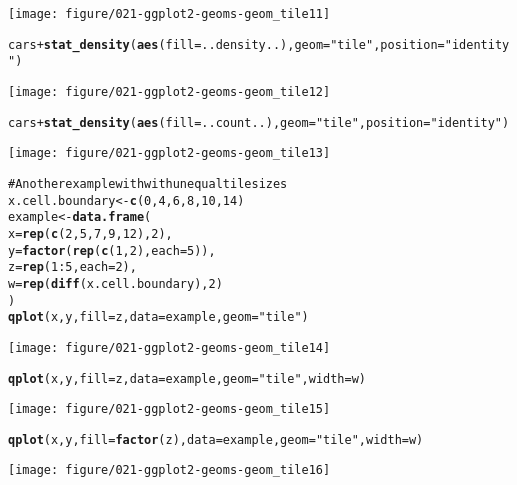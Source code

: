 \documentclass[a4paper,titlepage]{tufte-handout}\usepackage{graphicx, color}
\makeatletter
\def\maxwidth{ %
  \ifdim\Gin@nat@width>\linewidth
    \linewidth
  \else
    \Gin@nat@width
  \fi
}
\newcommand{\hlfunctioncall}[1]{\textcolor[rgb]{0.501960784313725,0,0.329411764705882}{\textbf{#1}}}%
\newcommand{\hlstring}[1]{\textcolor[rgb]{0.6,0.6,1}{#1}}%
\newcommand{\hlcomment}[1]{\textcolor[rgb]{0.180392156862745,0.6,0.341176470588235}{#1}}%
\newenvironment{kframe}{%
 \def\at@end@of@kframe{}%
 \ifinner\ifhmode%
  \def\at@end@of@kframe{\end{minipage}}%
  \begin{minipage}{\columnwidth}%
 \fi\fi%
 \def\FrameCommand##1{\hskip\@totalleftmargin \hskip-\fboxsep
 \colorbox{shadecolor}{##1}\hskip-\fboxsep
     \hskip-\linewidth \hskip-\@totalleftmargin \hskip\columnwidth}%
 \MakeFramed {\advance\hsize-\width
   \@totalleftmargin\z@ \linewidth\hsize
   \@setminipage}}%
 {\par\unskip\endMakeFramed%
 \at@end@of@kframe}
\newenvironment{knitrout}{}{} %
\makeatother
\begin{document}
\begin{knitrout}
\begin{kframe}
\begin{alltt}
\end{alltt}
\end{kframe}\texttt{[image: figure/021-ggplot2-geoms-geom\_tile11]} \begin{kframe}\begin{alltt}
cars + \hlfunctioncall{stat_density}(\hlfunctioncall{aes}(fill=..density..), geom=\hlstring{"tile"}, position=\hlstring{"identity"})
\end{alltt}
\end{kframe}\texttt{[image: figure/021-ggplot2-geoms-geom\_tile12]} \begin{kframe}\begin{alltt}
cars + \hlfunctioncall{stat_density}(\hlfunctioncall{aes}(fill=..count..), geom=\hlstring{"tile"}, position=\hlstring{"identity"})
\end{alltt}
\end{kframe}\texttt{[image: figure/021-ggplot2-geoms-geom\_tile13]} \begin{kframe}\begin{alltt}
\hlcomment{# Another example with with unequal tile sizes}
x.cell.boundary <- \hlfunctioncall{c}(0, 4, 6, 8, 10, 14)
example <- \hlfunctioncall{data.frame}(
  x = \hlfunctioncall{rep}(\hlfunctioncall{c}(2, 5, 7, 9, 12), 2),
  y = \hlfunctioncall{factor}(\hlfunctioncall{rep}(\hlfunctioncall{c}(1,2), each=5)),
  z = \hlfunctioncall{rep}(1:5, each=2),
  w = \hlfunctioncall{rep}(\hlfunctioncall{diff}(x.cell.boundary), 2)
)
\hlfunctioncall{qplot}(x, y, fill=z, data=example, geom=\hlstring{"tile"})
\end{alltt}
\end{kframe}\texttt{[image: figure/021-ggplot2-geoms-geom\_tile14]} \begin{kframe}\begin{alltt}
\hlfunctioncall{qplot}(x, y, fill=z, data=example, geom=\hlstring{"tile"}, width=w)
\end{alltt}
\end{kframe}\texttt{[image: figure/021-ggplot2-geoms-geom\_tile15]} \begin{kframe}\begin{alltt}
\hlfunctioncall{qplot}(x, y, fill=\hlfunctioncall{factor}(z), data=example, geom=\hlstring{"tile"}, width=w)
\end{alltt}
\end{kframe}\texttt{[image: figure/021-ggplot2-geoms-geom\_tile16]} \begin{kframe}\begin{alltt}

\end{alltt}
\end{kframe}
\end{knitrout}
\end{document}
